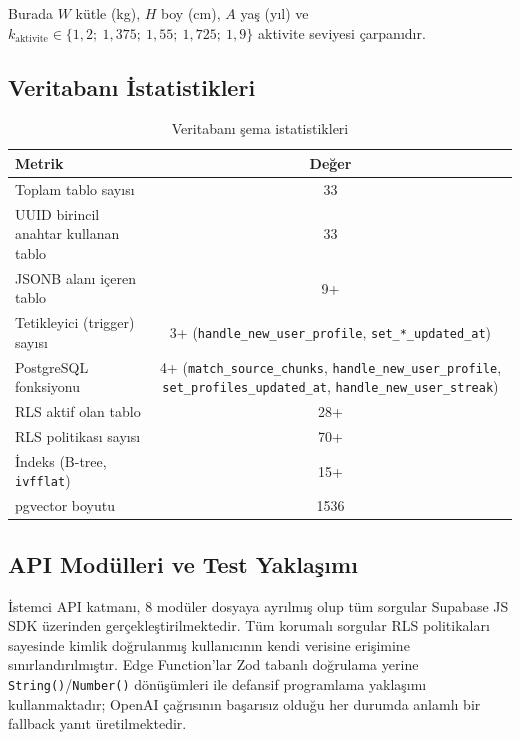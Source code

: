 Burada $W$ kütle (kg), $H$ boy (cm), $A$ yaş (yıl) ve $k_{\text{aktivite}} \in \{1{,}2;\ 1{,}375;\ 1{,}55;\ 1{,}725;\ 1{,}9\}$ aktivite seviyesi çarpanıdır.

\subsection{Veritabanı İstatistikleri}

\begin{table}[H]
\centering
\caption{Veritabanı şema istatistikleri}
\label{tab:db_stats}
\begin{tabular}{|l|c|}
\hline
\textbf{Metrik} & \textbf{Değer} \\
\hline
Toplam tablo sayısı                       & 33 \\
UUID birincil anahtar kullanan tablo      & 33 \\
JSONB alanı içeren tablo                  & 9+ \\
Tetikleyici (trigger) sayısı              & 3+ (\texttt{handle\_new\_user\_profile}, \texttt{set\_*\_updated\_at}) \\
PostgreSQL fonksiyonu                     & 4+ (\texttt{match\_source\_chunks}, \texttt{handle\_new\_user\_profile}, \texttt{set\_profiles\_updated\_at}, \texttt{handle\_new\_user\_streak}) \\
RLS aktif olan tablo                      & 28+ \\
RLS politikası sayısı                     & 70+ \\
İndeks (B-tree, \texttt{ivfflat})         & 15+ \\
pgvector boyutu                           & 1536 \\
\hline
\end{tabular}
\end{table}

\subsection{API Modülleri ve Test Yaklaşımı}

İstemci API katmanı, 8 modüler dosyaya ayrılmış olup tüm sorgular Supabase JS SDK üzerinden gerçekleştirilmektedir. Tüm korumalı sorgular RLS politikaları sayesinde kimlik doğrulanmış kullanıcının kendi verisine erişimine sınırlandırılmıştır. Edge Function'lar Zod tabanlı doğrulama yerine \texttt{String()}/\texttt{Number()} dönüşümleri ile defansif programlama yaklaşımı kullanmaktadır; OpenAI çağrısının başarısız olduğu her durumda anlamlı bir fallback yanıt üretilmektedir.

